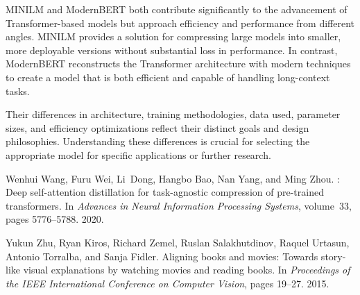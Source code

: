 \documentclass{article}
\begin{document}
MINILM and ModernBERT both contribute significantly to the advancement of Transformer-based models but approach efficiency and performance from different angles. MINILM provides a solution for compressing large models into smaller, more deployable versions without substantial loss in performance. In contrast, ModernBERT reconstructs the Transformer architecture with modern techniques to create a model that is both efficient and capable of handling long-context tasks.  
  
Their differences in architecture, training methodologies, data used, parameter sizes, and efficiency optimizations reflect their distinct goals and design philosophies. Understanding these differences is crucial for selecting the appropriate model for specific applications or further research.  
  
  
\begin{thebibliography}{10}  
  
Wenhui Wang, Furu Wei, Li~Dong, Hangbo Bao, Nan Yang, and Ming Zhou.  
: Deep self-attention distillation for task-agnostic compression of pre-trained transformers.  
\newblock In \emph{Advances in Neural Information Processing Systems}, volume~33, pages 5776--5788. 2020.  
  
Yukun Zhu, Ryan Kiros, Richard Zemel, Ruslan Salakhutdinov, Raquel Urtasun, Antonio Torralba, and Sanja Fidler.  
\newblock Aligning books and movies: Towards story-like visual explanations by watching movies and reading books.  
\newblock In \emph{Proceedings of the IEEE International Conference on Computer Vision}, pages 19--27. 2015.  
  
\end{thebibliography}  
  
\end{document}
